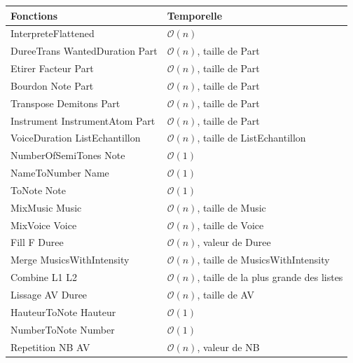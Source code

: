 \documentclass[10pt,a4paper]{article}
\begin{document}
\begin{center}
		\begin{tabular}{|l|l|}
		\hline
		\textbf{Fonctions}																& \textbf{Temporelle}								\\
		\hline
		InterpreteFlattened																& $\mathcal{O}(n)$ 									\\
		\hline
		DureeTrans WantedDuration Part 				& $\mathcal{O}(n)$, taille de Part								\\
		\hline 
		Etirer Facteur Part										& $\mathcal{O}(n)$, taille de Part 						 	\\
		\hline
		Bourdon Note Part											& $\mathcal{O}(n)$, taille de Part 						 	\\
		\hline
		Transpose Demitons Part								& $\mathcal{O}(n)$, taille de Part 						 	\\
		\hline
		Instrument InstrumentAtom Part				& $\mathcal{O}(n)$, taille de Part								\\
		\hline
		VoiceDuration ListEchantillon					& $\mathcal{O}(n)$, taille de ListEchantillon	 	\\
		\hline
		NumberOfSemiTones Note								& $\mathcal{O}(1)$ 														 	\\
		\hline
		NameToNumber Name											& $\mathcal{O}(1)$ 														 	\\
		\hline
		ToNote Note														& $\mathcal{O}(1)$ 															 \\ 
		\hline
		\hline
		MixMusic Music												& $\mathcal{O}(n)$, taille de Music						 \\
		\hline
		MixVoice Voice												& $\mathcal{O}(n)$, taille de Voice						 \\
		\hline
		Fill F Duree													& $\mathcal{O}(n)$, valeur de Duree						 \\
		\hline
		Merge MusicsWithIntensity							& $\mathcal{O}(n)$, taille de MusicsWithIntensity	 \\
		\hline
		Combine L1 L2													& $\mathcal{O}(n)$, taille de la plus grande des listes	 \\
		\hline
		Lissage AV Duree											& $\mathcal{O}(n)$, taille de AV								 \\
		\hline
		HauteurToNote Hauteur									& $\mathcal{O}(1)$ 														 \\
		\hline
		NumberToNote Number										& $\mathcal{O}(1)$ 														 \\
		\hline
		Repetition NB AV											& $\mathcal{O}(n)$, valeur de NB							 \\

\end{tabular}
\end{center}
\end{document}
